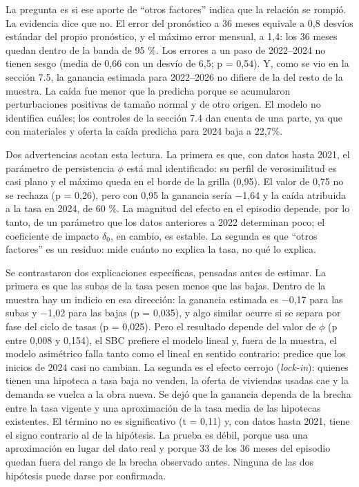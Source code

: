 \documentclass[11pt,a4paper]{article}
\begin{document}
La pregunta es si ese aporte de ``otros factores'' indica que la relación se rompió. La evidencia dice que no. El error del pronóstico a 36 meses equivale a 0,8 desvíos estándar del propio pronóstico, y el máximo error mensual, a 1,4: los 36 meses quedan dentro de la banda de 95 \%. Los errores a un paso de 2022--2024 no tienen sesgo (media de 0,66 con un desvío de 6,5; p = 0,54). Y, como se vio en la sección 7.5, la ganancia estimada para 2022--2026 no difiere de la del resto de la muestra. La caída fue menor que la predicha porque se acumularon perturbaciones positivas de tamaño normal y de otro origen. El modelo no identifica cuáles; los controles de la sección 7.4 dan cuenta de una parte, ya que con materiales y oferta la caída predicha para 2024 baja a 22,7\%.

Dos advertencias acotan esta lectura. La primera es que, con datos hasta 2021, el parámetro de persistencia $\phi$ está mal identificado: su perfil de verosimilitud es casi plano y el máximo queda en el borde de la grilla (0,95). El valor de 0,75 no se rechaza (p = 0,26), pero con 0,95 la ganancia sería $-$1,64 y la caída atribuida a la tasa en 2024, de 60 \%. La magnitud del efecto en el episodio depende, por lo tanto, de un parámetro que los datos anteriores a 2022 determinan poco; el coeficiente de impacto $\delta_0$, en cambio, es estable. La segunda es que ``otros factores'' es un residuo: mide cuánto no explica la tasa, no qué lo explica.

Se contrastaron dos explicaciones específicas, pensadas antes de estimar. La primera es que las subas de la tasa pesen menos que las bajas. Dentro de la muestra hay un indicio en esa dirección: la ganancia estimada es $-$0,17 para las subas y $-$1,02 para las bajas (p = 0,035), y algo similar ocurre si se separa por fase del ciclo de tasas (p = 0,025). Pero el resultado depende del valor de $\phi$ (p entre 0,008 y 0,154), el SBC prefiere el modelo lineal y, fuera de la muestra, el modelo asimétrico falla tanto como el lineal en sentido contrario: predice que los inicios de 2024 casi no cambian. La segunda es el efecto cerrojo (\emph{lock-in}): quienes tienen una hipoteca a tasa baja no venden, la oferta de viviendas usadas cae y la demanda se vuelca a la obra nueva. Se dejó que la ganancia dependa de la brecha entre la tasa vigente y una aproximación de la tasa media de las hipotecas existentes. El término no es significativo (t = 0,11) y, con datos hasta 2021, tiene el signo contrario al de la hipótesis. La prueba es débil, porque usa una aproximación en lugar del dato real y porque 33 de los 36 meses del episodio quedan fuera del rango de la brecha observado antes. Ninguna de las dos hipótesis puede darse por confirmada.
\end{document}
